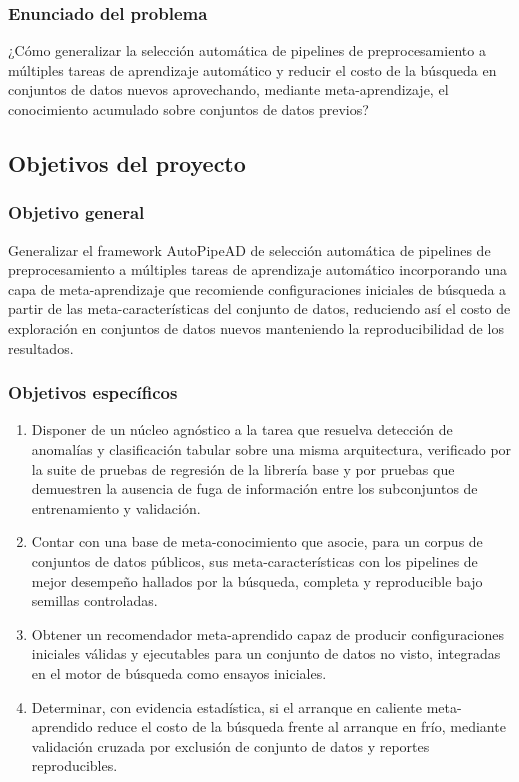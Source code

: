 \documentclass[12pt,letterpaper,oneside]{article}
\begin{document}
\subsubsection{Enunciado del problema}

¿Cómo generalizar la selección automática de pipelines de preprocesamiento a múltiples
tareas de aprendizaje automático y reducir el costo de la búsqueda en conjuntos de datos
nuevos aprovechando, mediante meta-aprendizaje, el conocimiento acumulado sobre conjuntos
de datos previos?

\subsection{Objetivos del proyecto}

\subsubsection{Objetivo general}

Generalizar el framework AutoPipeAD de selección automática de pipelines de
preprocesamiento a múltiples tareas de aprendizaje automático incorporando una capa de
meta-aprendizaje que recomiende configuraciones iniciales de búsqueda a partir de las
meta-características del conjunto de datos, reduciendo así el costo de exploración
en conjuntos de datos nuevos manteniendo la reproducibilidad de los resultados.

\subsubsection{Objetivos específicos}

\begin{enumerate}
  \item Disponer de un núcleo agnóstico a la tarea que resuelva detección de anomalías y
        clasificación tabular sobre una misma arquitectura, verificado por la suite de
        pruebas de regresión de la librería base y por pruebas que demuestren la
        ausencia de fuga de información entre los subconjuntos de entrenamiento y
        validación.

  \item Contar con una base de meta-conocimiento que asocie, para un corpus de conjuntos
        de datos públicos, sus meta-características con los pipelines de mejor desempeño
        hallados por la búsqueda, completa y reproducible bajo semillas controladas.

  \item Obtener un recomendador meta-aprendido capaz de producir configuraciones
        iniciales válidas y ejecutables para un conjunto de datos no visto, integradas en
        el motor de búsqueda como ensayos iniciales.

  \item Determinar, con evidencia estadística, si el arranque en caliente meta-aprendido
        reduce el costo de la búsqueda frente al arranque en frío, mediante validación
        cruzada por exclusión de conjunto de datos y reportes reproducibles.
\end{enumerate}
\end{document}
